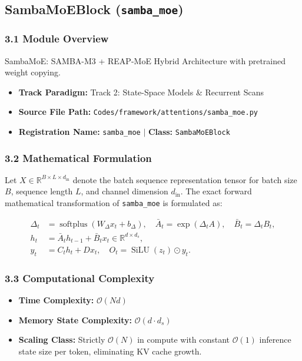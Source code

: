 \subsection{SambaMoEBlock (\texttt{samba\_moe})}
\label{sec:app_module_samba_moe}

\subsubsection*{3.1 Module Overview}
SambaMoE: SAMBA-M3 + REAP-MoE Hybrid Architecture with pretrained weight copying.
\begin{itemize}
    \item \textbf{Track Paradigm:} Track 2: State-Space Models & Recurrent Scans
    \item \textbf{Source File Path:} \texttt{Codes/framework/attentions/samba\_moe.py}
    \item \textbf{Registration Name:} \texttt{samba\_moe} $\mid$ \textbf{Class:} \texttt{SambaMoEBlock}
\end{itemize}

\subsubsection*{3.2 Mathematical Formulation}
Let $X \in \mathbb{R}^{B \times L \times d_{\text{in}}}$ denote the batch sequence representation tensor for batch size $B$, sequence length $L$, and channel dimension $d_{\text{in}}$. The exact forward mathematical transformation of \texttt{samba\_moe} is formulated as:

\begin{align}
\Delta_t &= \operatorname{softplus}(W_\Delta x_t + b_\Delta), \quad \bar{A}_t = \exp(\Delta_t A), \quad \bar{B}_t = \Delta_t B_t, \\
h_t &= \bar{A}_t h_{t-1} + \bar{B}_t x_t \in \mathbb{R}^{d \times d_s}, \\
y_t &= C_t h_t + D x_t, \quad O_t = \operatorname{SiLU}(z_t) \odot y_t.
\end{align}


\subsubsection*{3.3 Computational Complexity}
\begin{itemize}
    \item \textbf{Time Complexity:} $\mathcal{O}(N d)$
    \item \textbf{Memory State Complexity:} $\mathcal{O}(d \cdot d_s)$
    \item \textbf{Scaling Class:} Strictly $\mathcal{O}(N)$ in compute with constant $\mathcal{O}(1)$ inference state size per token, eliminating KV cache growth.
\end{itemize}

